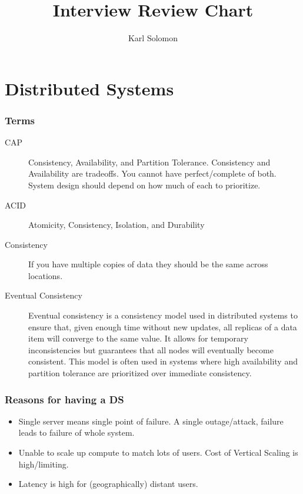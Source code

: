 \documentclass{article}
\begin{document}
\selectfont
\title{Interview Review Chart}
\author{Karl Solomon}
\maketitle
\tableofcontents
\part{Distributed Systems}
\section{Terms}
\begin{description}
	\item[CAP]
	      Consistency, Availability, and Partition Tolerance. Consistency and Availability are tradeoffs. You cannot have perfect/complete of both. System design should depend on how much of each to prioritize.
\end{description}
\begin{description}
	\item[ACID]
	      Atomicity, Consistency, Isolation, and Durability
\end{description}
\begin{description}
	\item[Consistency]
	      If you have multiple copies of data they should be the same across locations.
\end{description}
\begin{description}
	\item[Eventual Consistency]
	      Eventual consistency is a consistency model used in distributed systems to ensure that, given enough time without new updates, all replicas of a data item will converge to the same value. It allows for temporary inconsistencies but guarantees that all nodes will eventually become consistent. This model is often used in systems where high availability and partition tolerance are prioritized over immediate consistency.
\end{description}

\section{Reasons for having a DS}
\begin{itemize}
	\item Single server means single point of failure. A single outage/attack, failure leads to failure of whole system.
	\item Unable to scale up compute to match lots of users. Cost of Vertical Scaling is high/limiting.
	\item Latency is high for (geographically) distant users.
\end{itemize}
\end{document}
